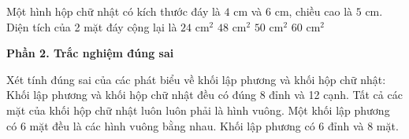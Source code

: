 \begin{ex} %
Một hình hộp chữ nhật có kích thước đáy là $4\text{ cm}$ và $6\text{ cm}$, chiều cao là $5\text{ cm}$. Diện tích của 2 mặt đáy cộng lại là
\choice
{$24\text{ cm}^2$}
{\True $48\text{ cm}^2$}
{$50\text{ cm}^2$}
{$60\text{ cm}^2$}
\end{ex}

\textbf{Phần 2. Trắc nghiệm đúng sai}

\begin{ex} %
Xét tính đúng sai của các phát biểu về khối lập phương và khối hộp chữ nhật:
\choiceTF
{\True Khối lập phương và khối hộp chữ nhật đều có đúng 8 đỉnh và 12 cạnh.}
{Tất cả các mặt của khối hộp chữ nhật luôn luôn phải là hình vuông.}
{\True Một khối lập phương có 6 mặt đều là các hình vuông bằng nhau.}
{Khối lập phương có 6 đỉnh và 8 mặt.}
\end{ex}

